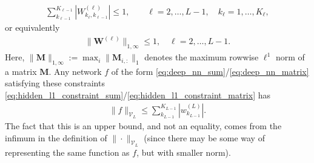 \documentclass{article}
\def\mM{{\bm{M}}}
\def\mW{{\bm{W}}}
\def\cV{{\mathcal{V}}}
\begin{document}
\begin{align} \label{eq:hidden_l1_constraint_sum}
    \sum_{k_{\ell-1}}^{K_{\ell-1}} \left| W_{k_\ell, k_{\ell-1}}^{(\ell)} \right| \leq 1, \qquad \ell=2, \dots, L-1, \quad  k_\ell = 1, \dots, K_\ell,
\end{align}
or equivalently
\begin{align} \label{eq:hidden_l1_constraint_matrix}
    \| \mW^{(\ell)} \|_{1,\infty} \leq 1, \quad \ell=2, \dots, L-1.
\end{align}
Here, $\| \mM \|_{1,\infty} := \max_i \| \mM_{i,:} \|_1$ denotes the maximum rowwise $\ell^1$ norm of a matrix $\mM$. Any network $f$ of the form \eqref{eq:deep_nn_sum}/\eqref{eq:deep_nn_matrix} satisfying these constraints \eqref{eq:hidden_l1_constraint_sum}/\eqref{eq:hidden_l1_constraint_matrix} has
\begin{align}
    \| f \|_{\cV_L} \leq \sum_{k_{L-1}}^{K_{L-1}} 
    \left| w_{k_{L-1}}^{(L)} \right|.
\end{align}
The fact that this is an upper bound, and not an equality, comes from the infimum in the definition of $\| \cdot \|_{\cV_L}$ (since  there may be some way of representing the same function as $f$, but with smaller norm). 
\end{document}
